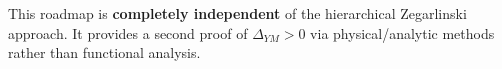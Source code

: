 \begin{remark}
This roadmap is \textbf{completely independent} of the hierarchical Zegarlinski 
approach. It provides a second proof of $\Delta_{YM} > 0$ via physical/analytic 
methods rather than functional analysis.
\end{remark}







